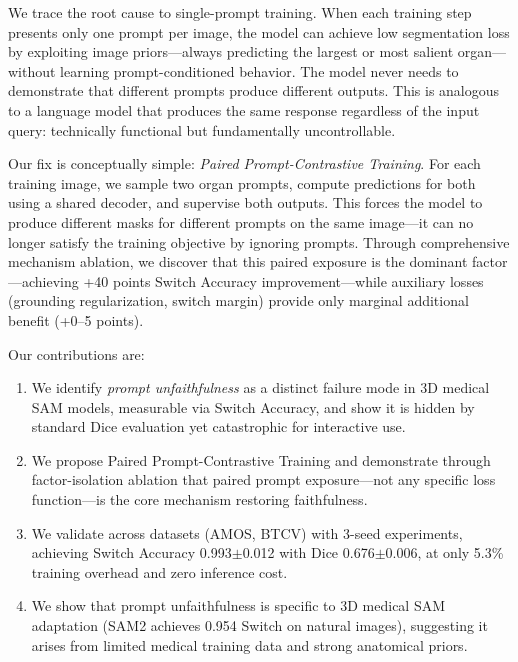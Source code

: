 We trace the root cause to single-prompt training. When each training step presents only one prompt per image, the model can achieve low segmentation loss by exploiting image priors---always predicting the largest or most salient organ---without learning prompt-conditioned behavior. The model never needs to demonstrate that different prompts produce different outputs. This is analogous to a language model that produces the same response regardless of the input query: technically functional but fundamentally uncontrollable.

Our fix is conceptually simple: \emph{Paired Prompt-Contrastive Training}. For each training image, we sample two organ prompts, compute predictions for both using a shared decoder, and supervise both outputs. This forces the model to produce different masks for different prompts on the same image---it can no longer satisfy the training objective by ignoring prompts. Through comprehensive mechanism ablation, we discover that this paired exposure is the dominant factor---achieving +40 points Switch Accuracy improvement---while auxiliary losses (grounding regularization, switch margin) provide only marginal additional benefit (+0--5 points).

Our contributions are:
\begin{enumerate}
    \item We identify \emph{prompt unfaithfulness} as a distinct failure mode in 3D medical SAM models, measurable via Switch Accuracy, and show it is hidden by standard Dice evaluation yet catastrophic for interactive use.
    \item We propose Paired Prompt-Contrastive Training and demonstrate through factor-isolation ablation that paired prompt exposure---not any specific loss function---is the core mechanism restoring faithfulness.
    \item We validate across datasets (AMOS, BTCV) with 3-seed experiments, achieving Switch Accuracy 0.993$\pm$0.012 with Dice 0.676$\pm$0.006, at only 5.3\% training overhead and zero inference cost.
    \item We show that prompt unfaithfulness is specific to 3D medical SAM adaptation (SAM2 achieves 0.954 Switch on natural images), suggesting it arises from limited medical training data and strong anatomical priors.
\end{enumerate}
